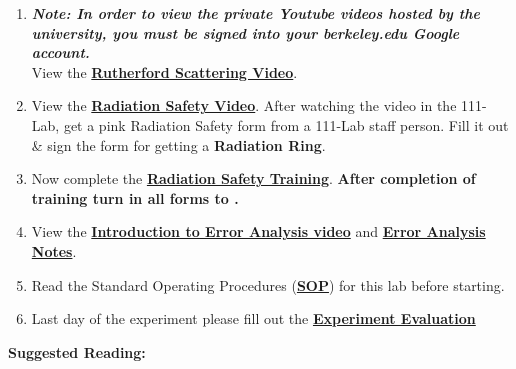 \documentclass{../lab}
\begin{document}
\begin{enumerate}
    \item \emph{\textbf{Note: In order to view the private Youtube videos hosted by the university, you must be signed into your berkeley.edu Google account.}} \\
    View the \href{http://youtu.be/xHzzXiMEmaU}{\textbf{Rutherford Scattering Video}}.

    \item View the \href{http://youtu.be/KHxtzF5pZZM}{\textbf{\textbf{Radiation Safety Video}}}. After watching the video in the 111-Lab, get a pink Radiation Safety form from a 111-Lab staff person. Fill it out \& sign the form for getting a \textbf{Radiation Ring}.

    \item Now complete the  \href{http://experimentationlab.berkeley.edu/RadiationSafety}{\textbf{Radiation Safety Training}}. \textbf{After completion of training turn in all forms to \LabEngineer.}

    \item View the \href{\ErrorAnalysisVideo}{\textbf{Introduction to Error Analysis video}} and \href{http://experimentationlab.berkeley.edu/EAX}{\textbf{Error Analysis Notes}}.

    \item Read the Standard Operating Procedures (\href{http://experimentationlab.berkeley.edu/sites/default/files/images/SOP\_3271\_Cs-137\_Na-22\_Co-60\_Mn-54\_Am-241\_Fe-55\_2014.pdf}{\textbf{SOP}}) for this lab before starting.

    \item Last day of the experiment please fill out the \href{\ExperimentEvaluation}{\textbf{Experiment Evaluation}}

\end{enumerate}

\noindent\textbf{Suggested Reading:}
\end{document}
